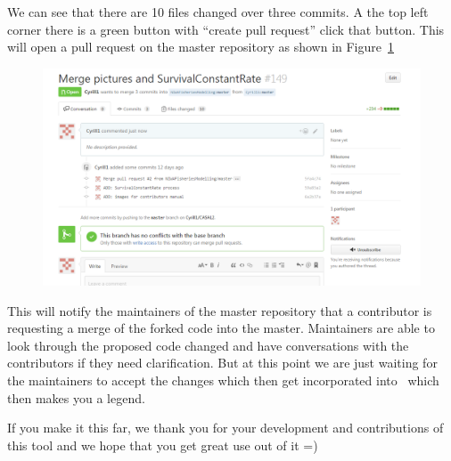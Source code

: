 We can see that there are 10 files changed over three commits. A the top left corner there is a green button with \enquote{create pull request} click that button. This will open a pull request on the master repository as shown in Figure~\ref{fig:fork_merge2}
\begin{figure}[!ht]
	\centering
	\includegraphics[scale=0.6]{Figures/Pull_request1.png}
	\caption{}\label{fig:fork_merge2}
\end{figure}

This will notify the maintainers of the master repository that a contributor is requesting a merge of the forked code into the master. Maintainers are able to look through the proposed code changed and have conversations with the contributors if they need clarification. But at this point we are just waiting for the maintainers to accept the changes which then get incorporated into \CNAME\ which then makes you a legend.

If you make it this far, we thank you for your development and contributions of this tool and we hope that you get great use out of it =)


